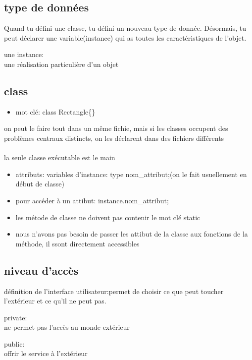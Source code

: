 \documentclass[a4paper,10pt]{article}
\begin{document}
\subsection{type de données}
Quand tu défini une classe, tu défini un nouveau type de donnée. Désormais,  tu peut déclarer une variable(instance) qui as toutes les caractéristiques de l'objet.
\begin{description}
 \item une instance:\\{une réalisation particulière d'un objet}
\end{description}
\subsection{class}
\begin{itemize}
 \item mot clé: class Rectangle\{\}
\end{itemize}
on peut le faire tout dans un même fichie, mais si les classes occupent des problèmes centraux distincts, on les déclarent dans des fichiers différents
\paragraph{}
la seule classe exécutable est le main
\begin{itemize}
 \item attributs: variables d'instance: type nom\_attribut;(on le fait usuellement en début de classe)
 \item pour accéder à un attibut: instance.nom\_attribut;
 \item les métode de classe ne doivent pas contenir le mot clé static
 \item nous n'avons pas besoin de passer les attibut de la classe aux fonctions de la méthode, il ssont directement accessibles
\end{itemize}
\subsection{niveau d'accès}
définition de l'interface utilisateur:permet de choisir ce que peut toucher l'extérieur  et ce qu'il ne peut pas.
\begin{description}
 \item private:\\{ne permet pas l'accès au monde extérieur}
 \item public:\\{offrir le service à l'extérieur}
\end{description}
\end{document}

